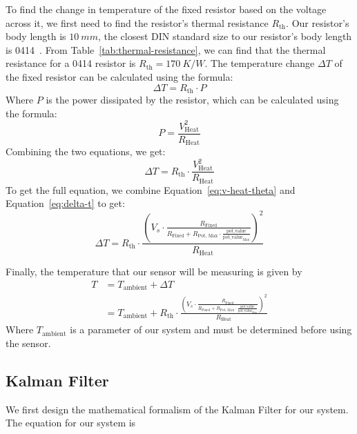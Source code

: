 \documentclass[12pt,a4paper]{article}
\begin{document}
To find the change in temperature of the fixed resistor based on the voltage across it, we first need to find the resistor's thermal resistance $R_{\text{th}}$. Our resistor's body length is $\SI{10}{mm}$, the closest DIN standard size to our resistor's body length is 0414~\cite[pp.~13]{din}. From Table~\ref{tab:thermal-resistance}, we can find that the thermal resistance for a 0414 resistor is $R_{\text{th}} = \SI{170}{K/W}$. The temperature change $\Delta T$ of the fixed resistor can be calculated using the formula:
\begin{equation*}
    \Delta T = R_{\text{th}} \cdot P
\end{equation*}
Where $P$ is the power dissipated by the resistor, which can be calculated using the formula:
\begin{equation*}
    P = \frac{V_{\text{Heat}}^2}{R_{\text{Heat}}}
\end{equation*}
Combining the two equations, we get:
\begin{equation}
    \Delta T = R_{\text{th}} \cdot \frac{V_{\text{Heat}}^2}{R_{\text{Heat}}}
    \label{eq:delta-t}
\end{equation}
To get the full equation, we combine Equation~\ref{eq:v-heat-theta} and Equation~\ref{eq:delta-t} to get:
\begin{equation}
    \Delta T = R_{\text{th}} \cdot \frac{\left(V_s \cdot \frac{R_{\text{Fixed}}}{R_{\text{Fixed}} + R_{\text{Pot, Max}} \cdot \frac{\text{pot\_value}}{\text{pot\_value}_{\text{Max}}}}\right)^2}{R_{\text{Heat}}}
    \label{eq:full-delta-t}
\end{equation}

Finally, the temperature that our sensor will be measuring is given by
\begin{align}
    T &= T_{\text{ambient}} + \Delta T \nonumber \\
      &= T_{\text{ambient}} + R_{\text{th}} \cdot \frac{\left(V_s \cdot \frac{R_{\text{Fixed}}}{R_{\text{Fixed}} + R_{\text{Pot, Max}} \cdot \frac{\text{pot\_value}}{\text{pot\_value}_{\text{Max}}}}\right)^2}{R_{\text{Heat}}} \label{eq:final-temp}
\end{align}
Where $T_{\text{ambient}}$ is a parameter of our system and must be determined before using the sensor.


\label{sec:math-model}

\subsection{Kalman Filter}
We first design the mathematical formalism of the Kalman Filter for our system. The equation for our system is
\end{document}
